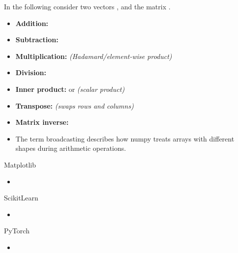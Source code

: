 \begin{frame}
	\vspace*{2mm}
	In the following consider two vectors ,  and the matrix .
	\vspace*{2mm}
	\begin{itemize}
		\item \textbf{Addition:} 
		\item \textbf{Subtraction:} 
		\item \textbf{Multiplication:}  \textit{(Hadamard/element-wise product)}
		\item \textbf{Division:} 
		\item \textbf{Inner product:}  or  \textit{(scalar product)}
		\item \textbf{Transpose:}  \textit{(swaps rows and columns)}
		\item \textbf{Matrix inverse:} 
	\end{itemize}
\end{frame}


\begin{frame}
	\begin{itemize}
		\item The term broadcasting describes how numpy treats arrays with different shapes during arithmetic operations.
	\end{itemize}
\end{frame}


\begin{dwHeaderFrame}{Matplotlib}
	\begin{itemize}
		\item
	\end{itemize}
\end{dwHeaderFrame}


\begin{dwHeaderFrame}{ScikitLearn}
	\begin{itemize}
		\item
	\end{itemize}
\end{dwHeaderFrame}


\begin{dwHeaderFrame}{PyTorch}
	\begin{itemize}
		\item
	\end{itemize}
\end{dwHeaderFrame}


\makethanks


